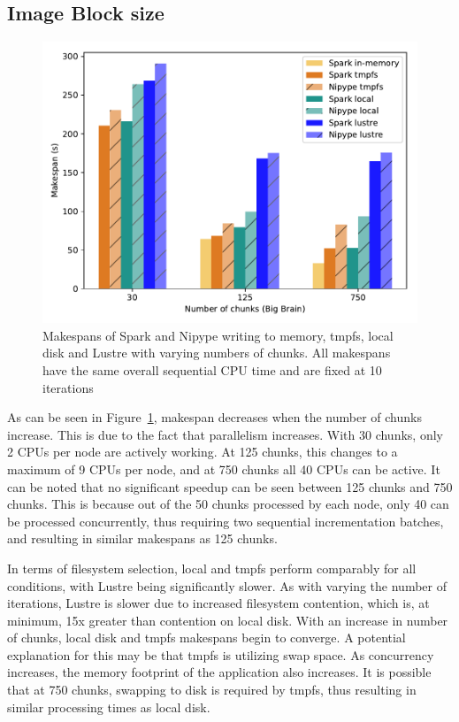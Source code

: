 \documentclass{IEEEtran}
\begin{document}
\subsection{Image Block size}
\begin{figure}[h]
    \centering
    \includegraphics[width=\linewidth]{results/figures/numchunks.pdf}
    \caption{Makespans of Spark and Nipype writing to memory, tmpfs, local 
             disk and Lustre with varying numbers of chunks. All 
             makespans have the same overall sequential CPU time and 
             are fixed at 
             10 iterations}\label{fig:numchunks}
\end{figure}
As can be seen in Figure~\ref{fig:numchunks}, makespan decreases when the number 
of chunks increase. This is due to the fact that parallelism increases. With 
30 chunks, only 2 CPUs per node are actively working. At 125 chunks, this 
changes to a maximum of 9 CPUs per node, and at 750 chunks all 40 CPUs can be 
active. It can be noted that no significant speedup can be seen between 125 
chunks and 750 chunks. This is because out of the 50 chunks processed by each 
node, only 40 can be processed concurrently, thus requiring two sequential 
incrementation batches, and resulting in similar makespans as 125 
chunks.

In terms of filesystem selection, local and tmpfs perform comparably for all 
conditions, with Lustre being significantly slower. As with varying the number 
of iterations, Lustre is slower due to increased filesystem contention, which 
is, at minimum, 15x greater than contention on local disk. With an increase in 
number of chunks, local disk and tmpfs makespans begin to converge. A potential 
explanation for this may be that tmpfs is utilizing swap space. As concurrency 
increases, the memory footprint of the application also increases. It is 
possible that at 750 chunks, swapping to disk is required by tmpfs, thus 
resulting in similar processing times as local disk.
\end{document}
